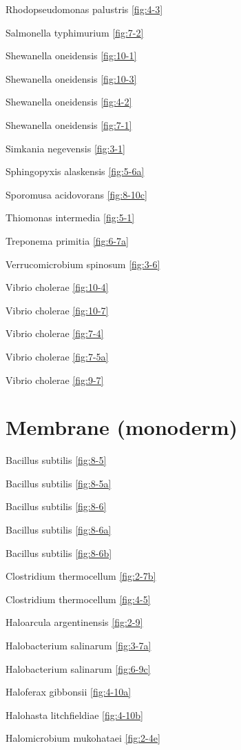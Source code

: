 \documentclass[]{tufte-book}
\begin{document}
Rhodopseudomonas palustris \ref{fig:4-3}

Salmonella typhimurium \ref{fig:7-2}

Shewanella oneidensis \ref{fig:10-1}

Shewanella oneidensis \ref{fig:10-3}

Shewanella oneidensis \ref{fig:4-2}

Shewanella oneidensis \ref{fig:7-1}

Simkania negevensis \ref{fig:3-1}

Sphingopyxis alaskensis \ref{fig:5-6a}

Sporomusa acidovorans \ref{fig:8-10c}

Thiomonas intermedia \ref{fig:5-1}

Treponema primitia \ref{fig:6-7a}

Verrucomicrobium spinosum \ref{fig:3-6}

Vibrio cholerae \ref{fig:10-4}

Vibrio cholerae \ref{fig:10-7}

Vibrio cholerae \ref{fig:7-4}

Vibrio cholerae \ref{fig:7-5a}

Vibrio cholerae \ref{fig:9-7}

\hypertarget{membrane-monoderm}{%
\section*{Membrane (monoderm)}\label{membrane-monoderm}}

Bacillus subtilis \ref{fig:8-5}

Bacillus subtilis \ref{fig:8-5a}

Bacillus subtilis \ref{fig:8-6}

Bacillus subtilis \ref{fig:8-6a}

Bacillus subtilis \ref{fig:8-6b}

Clostridium thermocellum \ref{fig:2-7b}

Clostridium thermocellum \ref{fig:4-5}

Haloarcula argentinensis \ref{fig:2-9}

Halobacterium salinarum \ref{fig:3-7a}

Halobacterium salinarum \ref{fig:6-9c}

Haloferax gibbonsii \ref{fig:4-10a}

Halohasta litchfieldiae \ref{fig:4-10b}

Halomicrobium mukohataei \ref{fig:2-4e}
\end{document}
